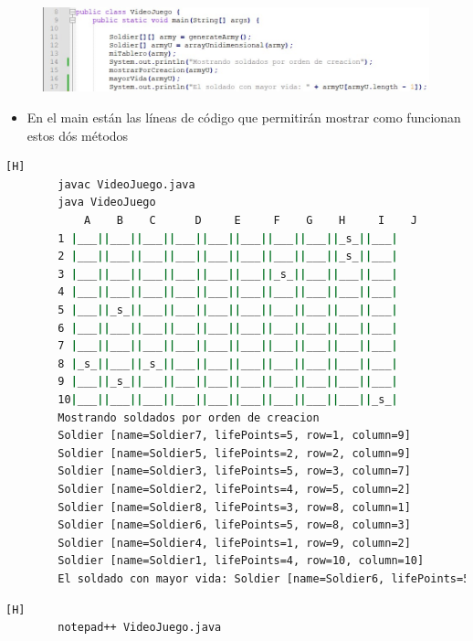 \documentclass{article}
\begin{document}
	\begin{figure}[H]
		\centering
		\includegraphics[width=1.2\textwidth,keepaspectratio]{img/7.jpg}
	\end{figure}
		
	\begin{itemize}	
		\item En el main están las líneas de código que permitirán mostrar como funcionan estos dós métodos
	\end{itemize}	
		
	\begin{lstlisting}[language=bash,caption={ Compilación de los métodos creados hasta el momento }][H]
		javac VideoJuego.java
		java VideoJuego
		    A    B    C      D     E     F    G    H     I    J
		1 |___||___||___||___||___||___||___||___||_s_||___|
		2 |___||___||___||___||___||___||___||___||_s_||___|
		3 |___||___||___||___||___||___||_s_||___||___||___|
		4 |___||___||___||___||___||___||___||___||___||___|
		5 |___||_s_||___||___||___||___||___||___||___||___|
		6 |___||___||___||___||___||___||___||___||___||___|
		7 |___||___||___||___||___||___||___||___||___||___|
		8 |_s_||___||_s_||___||___||___||___||___||___||___|
		9 |___||_s_||___||___||___||___||___||___||___||___|
		10|___||___||___||___||___||___||___||___||___||_s_|
		Mostrando soldados por orden de creacion
		Soldier [name=Soldier7, lifePoints=5, row=1, column=9]
		Soldier [name=Soldier5, lifePoints=2, row=2, column=9]
		Soldier [name=Soldier3, lifePoints=5, row=3, column=7]
		Soldier [name=Soldier2, lifePoints=4, row=5, column=2]
		Soldier [name=Soldier8, lifePoints=3, row=8, column=1]
		Soldier [name=Soldier6, lifePoints=5, row=8, column=3]
		Soldier [name=Soldier4, lifePoints=1, row=9, column=2]
		Soldier [name=Soldier1, lifePoints=4, row=10, column=10]
		El soldado con mayor vida: Soldier [name=Soldier6, lifePoints=5, row=8, column=3]	
	\end{lstlisting}
		
		
		
	\begin{lstlisting}[language=bash,caption={ Se crea el método que calcula el promedio y puntos de vida total del ejército }][H]
		notepad++ VideoJuego.java	
	\end{lstlisting}	
		
\end{document}
